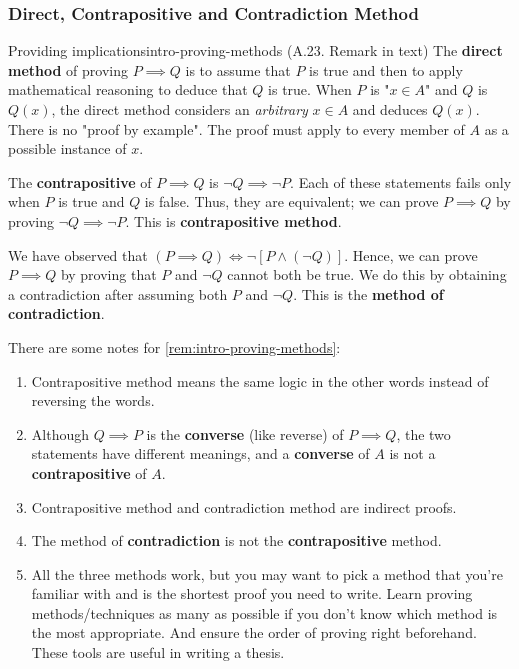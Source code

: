 \documentclass[../src/handouts/main.tex]{subfiles}
\begin{document}
\subsubsection{Direct, Contrapositive and Contradiction Method}

\begin{remark}{Providing implications}{intro-proving-methods}
  (A.23. Remark in text)
  The \textbf{direct method} of proving $P \implies Q$ is to assume that $P$ is true and then to apply mathematical reasoning to deduce that $Q$ is true.
  When $P$ is "$x \in A$" and $Q$ is $Q(x)$, the direct method considers an \textit{arbitrary} $x \in A$ and deduces $Q(x)$.
  There is no "proof by example".
  The proof must apply to every member of $A$ as a possible instance of $x$.

  The \textbf{contrapositive} of $P \implies Q$ is $\neg Q \implies \neg P$. Each of these statements fails only when $P$ is true and $Q$ is false. Thus, they are equivalent; we can prove $P \implies Q$ by proving $\neg Q \implies \neg P$. This is \textbf{contrapositive method}.

  We have observed that $(P \implies Q) \iff \neg \left[ P \land (\neg Q) \right]$.
  Hence, we can prove $P \implies Q$ by proving that $P$ and $\neg Q$ cannot both be true.
  We do this by obtaining a contradiction after assuming both $P$ and $\neg Q$.
  This is the \textbf{method of contradiction}.
\end{remark}

There are some notes for \cref{rem:intro-proving-methods}:
\begin{enumerate}
  \item Contrapositive method means the same logic in the other words instead of reversing the words.
  \item Although $Q \implies P$ is the \textbf{converse} (like reverse) of $P \implies Q$, the two statements have different meanings, and a \textbf{converse} of $A$ is not a \textbf{contrapositive} of $A$.
  \item Contrapositive method and contradiction method are indirect proofs.
  \item The method of \textbf{contradiction} is not the \textbf{contrapositive} method.
  \item All the three methods work, but you may want to pick a method that you're familiar with and is the shortest proof you need to write. Learn proving methods/techniques as many as possible if you don't know which method is the most appropriate. And ensure the order of proving right beforehand. These tools are useful in writing a thesis.
\end{enumerate}
\end{document}
